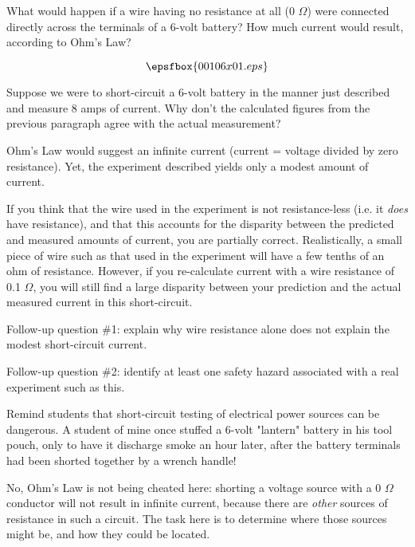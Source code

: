 

What would happen if a wire having no resistance at all (0 $\Omega$) were connected directly across the terminals of a 6-volt battery?  How much current would result, according to Ohm's Law?

$$\epsfbox{00106x01.eps}$$

Suppose we were to short-circuit a 6-volt battery in the manner just described and measure 8 amps of current.  Why don't the calculated figures from the previous paragraph agree with the actual measurement?







Ohm's Law would suggest an infinite current (current = voltage divided by zero resistance).  Yet, the experiment described yields only a modest amount of current.

If you think that the wire used in the experiment is not resistance-less (i.e. it {\it does} have resistance), and that this accounts for the disparity between the predicted and measured amounts of current, you are partially correct.  Realistically, a small piece of wire such as that used in the experiment will have a few tenths of an ohm of resistance.  However, if you re-calculate current with a wire resistance of 0.1 $\Omega$, you will still find a large disparity between your prediction and the actual measured current in this short-circuit.

\vskip 10pt

Follow-up question \#1: explain why wire resistance alone does not explain the modest short-circuit current.

\vskip 10pt

Follow-up question \#2: identify at least one safety hazard associated with a real experiment such as this.







Remind students that short-circuit testing of electrical power sources can be dangerous.  A student of mine once stuffed a 6-volt "lantern" battery in his tool pouch, only to have it discharge smoke an hour later, after the battery terminals had been shorted together by a wrench handle!

No, Ohm's Law is not being cheated here: shorting a voltage source with a 0 $\Omega$ conductor will not result in infinite current, because there are {\it other} sources of resistance in such a circuit.  The task here is to determine where those sources might be, and how they could be located.




